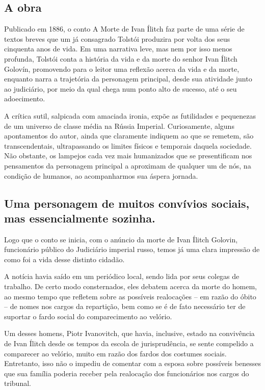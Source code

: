 \documentclass[12pt]{extarticle}
\begin{document}
\subsection{A obra}

Publicado em 1886, o conto A Morte de Ivan Ílitch faz parte de uma série
de textos breves que um já consagrado Tolstói produzira por volta dos
seus cinquenta anos de vida. Em uma narrativa leve, mas nem por isso
menos profunda, Tolstói conta a história da vida e da morte do senhor
Ivan Ílitch Golovín, promovendo para o leitor uma reflexão acerca da
vida e da morte, enquanto narra a trajetória da personagem
principal, desde sua atividade junto ao judiciário, por meio da qual chega
num ponto alto de sucesso, até o seu adoecimento.




A crítica sutil, salpicada com amaciada ironia, expõe as futilidades e
pequenezas de um universo de classe média na Rússia Imperial.
Curiosamente, alguns apontamentos do autor, ainda que claramente
indiquem ao que se remetem, são transcendentais, ultrapassando os limites
físicos e temporais daquela sociedade. Não obstante, os lampejos cada
vez mais humanizados que se presentificam nos pensamentos da personagem
principal a aproximam de qualquer um de nós, na condição de humanos, ao
acompanharmos sua áspera jornada.

\subsection{Uma personagem de muitos convívios sociais, mas essencialmente
sozinha.}

Logo que o conto se inicia, com o anúncio da morte de Ivan Ílitch
Golovin, funcionário público do Judiciário imperial russo, temos já
uma clara impressão de como foi a vida desse distinto cidadão.

A notícia havia saído em um periódico local, sendo lida por seus colegas de
trabalho. De certo modo consternados, eles debatem acerca da morte do
homem, ao mesmo tempo que refletem sobre as possíveis realocações -- em
razão do óbito -- de nomes nos cargos da repartição, bem como se é de
fato necessário ter de suportar o fardo social do comparecimento ao
velório.

Um desses homens, Piotr Ivanovitch, que havia, inclusive, estado na
convivência de Ivan Ílitch desde os tempos da escola de jurisprudência,
se sente compelido a comparecer ao velório, muito em razão dos fardos
dos costumes sociais. Entretanto, isso não o impediu de comentar com a
esposa sobre possíveis benesses que sua família poderia receber pela
realocação dos funcionários nos cargos do tribunal.
\end{document}

